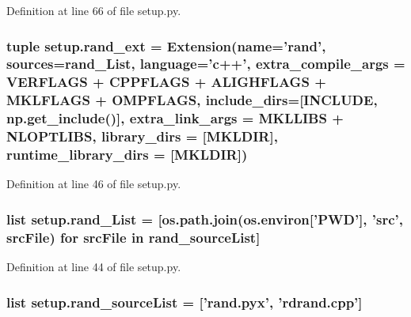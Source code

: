Definition at line 66 of file setup.\-py.

\hypertarget{namespacesetup_a72a912c8df91f65b2a80db002d55f4ff}{
\subsubsection[{rand\-\_\-ext}]{\setlength{\rightskip}{0pt plus 5cm}tuple setup.\-rand\-\_\-ext = Extension({\bf name}='rand', sources={\bf rand\-\_\-\-List}, language='{\bf c}++', extra\-\_\-compile\-\_\-args = {\bf V\-E\-R\-F\-L\-A\-G\-S} + {\bf C\-P\-P\-F\-L\-A\-G\-S} + {\bf A\-L\-I\-G\-H\-F\-L\-A\-G\-S} + {\bf M\-K\-L\-F\-L\-A\-G\-S} + {\bf O\-M\-P\-F\-L\-A\-G\-S}, include\-\_\-dirs=\mbox{[}{\bf I\-N\-C\-L\-U\-D\-E}, np.\-get\-\_\-include()\mbox{]}, extra\-\_\-link\-\_\-args = {\bf M\-K\-L\-L\-I\-B\-S} + {\bf N\-L\-O\-P\-T\-L\-I\-B\-S}, library\-\_\-dirs = \mbox{[}{\bf M\-K\-L\-D\-I\-R}\mbox{]}, runtime\-\_\-library\-\_\-dirs = \mbox{[}{\bf M\-K\-L\-D\-I\-R}\mbox{]})}}\label{namespacesetup_a72a912c8df91f65b2a80db002d55f4ff}


Definition at line 46 of file setup.\-py.

\hypertarget{namespacesetup_a7c78e16e81c92c4cb8ed8c293b885193}{
\subsubsection[{rand\-\_\-\-List}]{\setlength{\rightskip}{0pt plus 5cm}list setup.\-rand\-\_\-\-List = \mbox{[}os.\-path.\-join(os.\-environ\mbox{[}'P\-W\-D'\mbox{]}, 'src', src\-File) for src\-File in {\bf rand\-\_\-source\-List}\mbox{]}}}\label{namespacesetup_a7c78e16e81c92c4cb8ed8c293b885193}


Definition at line 44 of file setup.\-py.

\hypertarget{namespacesetup_a79e06cfe494233c86ded36a5f7852f95}{
\subsubsection[{rand\-\_\-source\-List}]{\setlength{\rightskip}{0pt plus 5cm}list setup.\-rand\-\_\-source\-List = \mbox{[}'rand.\-pyx', 'rdrand.\-cpp'\mbox{]}}}\label{namespacesetup_a79e06cfe494233c86ded36a5f7852f95}


